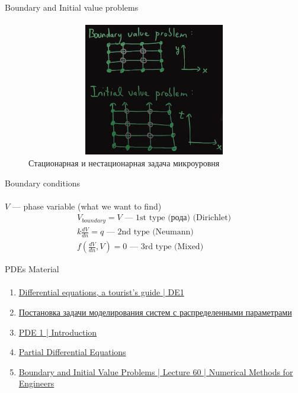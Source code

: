 \documentclass[aspectratio=169]{beamer}
\begin{document}
\begin{frame}[t]{Boundary and Initial value problems}
\framesubtitle{}
    \vspace{-0.6cm}
    \begin{figure}[H]
        \centering\includegraphics[height=5.8cm,width=1\textwidth,keepaspectratio]{boundary_problem.png}
        \caption*{Стационарная и нестационарная задача микроуровня}
        \label{fig:boundary_problem.png}
    \end{figure}
\end{frame}

\begin{frame}[t]{Boundary conditions}
\framesubtitle{}
$V$ --- phase variable (what we want to find)
    \begin{align*}
        V_{boundary} = V \text{ --- 1st type (рода) (Dirichlet)} \\
        k\frac{d V}{d n} = q \text{ --- 2nd type (Neumann)} \\
        f(\frac{d V}{d n}, V) = 0 \text{ --- 3rd type (Mixed)}
    \end{align*}
\end{frame}

\begin{frame}[t]{PDEs Material}
    \framesubtitle{}
    \begin{enumerate}
        \item \href{https://www.youtube.com/playlist?list=PLZHQObOWTQDNPOjrT6KVlfJuKtYTftqH6}{Differential equations, a tourist's guide | DE1}
        \item \href{http://bigor.bmstu.ru/?cnt/?doc=Mkr/post_st_old.mod/?cou=Mkr/base.cou}{Постановка задачи моделирования систем с распределенными параметрами}
        \item \href{https://www.youtube.com/playlist?list=PLF6061160B55B0203}{PDE 1 | Introduction}
        \item \href{https://youtu.be/afNZj5URZsc}{Partial Differential Equations}
        \item \href{https://youtu.be/tMO28AakkZ8}{Boundary and Initial Value Problems | Lecture 60 | Numerical Methods for Engineers}
    \end{enumerate}
\end{frame}
\end{document}
